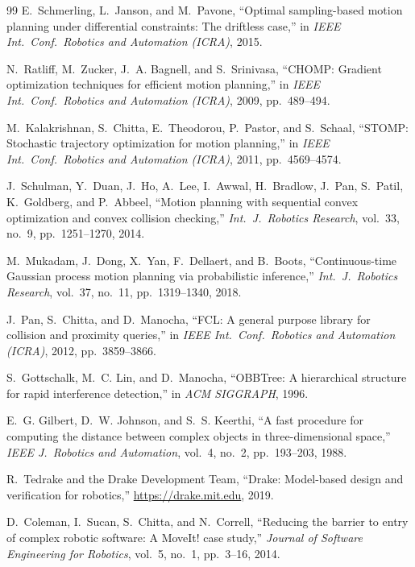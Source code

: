 \documentclass[journal]{IEEEtran}
\begin{document}
\begin{thebibliography}{99}
E.~Schmerling, L.~Janson, and M.~Pavone, ``Optimal sampling-based
motion planning under differential constraints: The driftless case,''
in \emph{IEEE Int.\ Conf.\ Robotics and Automation (ICRA)}, 2015.

N.~Ratliff, M.~Zucker, J.~A. Bagnell, and S.~Srinivasa, ``CHOMP:
Gradient optimization techniques for efficient motion planning,'' in
\emph{IEEE Int.\ Conf.\ Robotics and Automation (ICRA)}, 2009,
pp.~489--494.

M.~Kalakrishnan, S.~Chitta, E.~Theodorou, P.~Pastor, and S.~Schaal,
``STOMP: Stochastic trajectory optimization for motion planning,''
in \emph{IEEE Int.\ Conf.\ Robotics and Automation (ICRA)}, 2011,
pp.~4569--4574.

J.~Schulman, Y.~Duan, J.~Ho, A.~Lee, I.~Awwal, H.~Bradlow, J.~Pan,
S.~Patil, K.~Goldberg, and P.~Abbeel, ``Motion planning with
sequential convex optimization and convex collision checking,''
\emph{Int.\ J.\ Robotics Research}, vol.~33, no.~9, pp.~1251--1270,
2014.

M.~Mukadam, J.~Dong, X.~Yan, F.~Dellaert, and B.~Boots, ``Continuous-time
Gaussian process motion planning via probabilistic
inference,'' \emph{Int.\ J.\ Robotics Research}, vol.~37, no.~11,
pp.~1319--1340, 2018.

J.~Pan, S.~Chitta, and D.~Manocha, ``FCL: A general purpose library
for collision and proximity queries,'' in \emph{IEEE Int.\ Conf.\
Robotics and Automation (ICRA)}, 2012, pp.~3859--3866.

S.~Gottschalk, M.~C. Lin, and D.~Manocha, ``OBBTree: A hierarchical
structure for rapid interference detection,'' in \emph{ACM SIGGRAPH},
1996.

E.~G. Gilbert, D.~W. Johnson, and S.~S. Keerthi, ``A fast procedure
for computing the distance between complex objects in
three-dimensional space,'' \emph{IEEE J.\ Robotics and Automation},
vol.~4, no.~2, pp.~193--203, 1988.

R.~Tedrake and the Drake Development Team, ``Drake: Model-based
design and verification for robotics,'' \url{https://drake.mit.edu},
2019.

D.~Coleman, I.~Sucan, S.~Chitta, and N.~Correll, ``Reducing the
barrier to entry of complex robotic software: A MoveIt! case
study,'' \emph{Journal of Software Engineering for Robotics},
vol.~5, no.~1, pp.~3--16, 2014.


\end{thebibliography}
\end{document}

